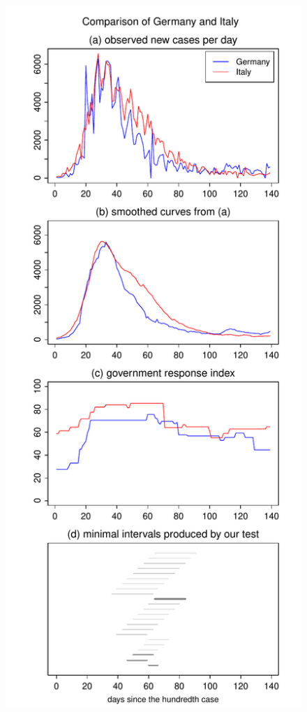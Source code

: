 \documentclass[a4paper,12pt]{article}
\numberwithin{equation}{section}
\begin{document}
\begin{figure}[h!]
\begin{minipage}[t]{0.49\textwidth}
\includegraphics[width=\textwidth]{plots/DEU_vs_ITA}

\end{minipage}
\end{figure}
\end{document}
